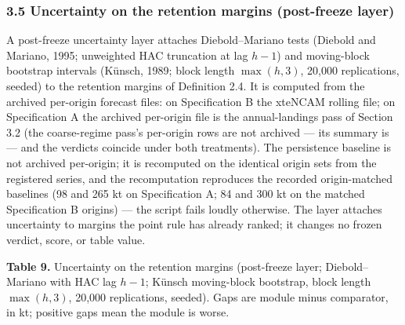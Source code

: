 \documentclass[11pt]{article}
\begin{document}
\subsubsection{3.5 Uncertainty on the retention margins (post-freeze
layer)}\label{uncertainty-on-the-retention-margins-post-freeze-layer}

A post-freeze uncertainty layer attaches Diebold--Mariano tests (Diebold
and Mariano, 1995; unweighted HAC truncation at lag \(h-1\)) and
moving-block bootstrap intervals (K\"unsch, 1989; block length
\(\max(h,3)\), 20,000 replications, seeded) to the retention margins of
Definition 2.4. It is computed from the archived per-origin forecast
files: on Specification B the xteNCAM rolling file; on Specification A
the archived per-origin file is the annual-landings pass of Section 3.2
(the coarse-regime pass's per-origin rows are not archived --- its
summary is --- and the verdicts coincide under both treatments). The
persistence baseline is not archived per-origin; it is recomputed on the
identical origin sets from the registered series, and the recomputation
reproduces the recorded origin-matched baselines (98 and 265 kt on
Specification A; 84 and 300 kt on the matched Specification B origins)
--- the script fails loudly otherwise. The layer attaches uncertainty to
margins the point rule has already ranked; it changes no frozen verdict,
score, or table value.

\textbf{Table 9.} Uncertainty on the retention margins (post-freeze
layer; Diebold--Mariano with HAC lag \(h-1\); K\"unsch moving-block
bootstrap, block length \(\max(h,3)\), 20,000 replications, seeded).
Gaps are module minus comparator, in kt; positive gaps mean the module
is worse.
\end{document}
